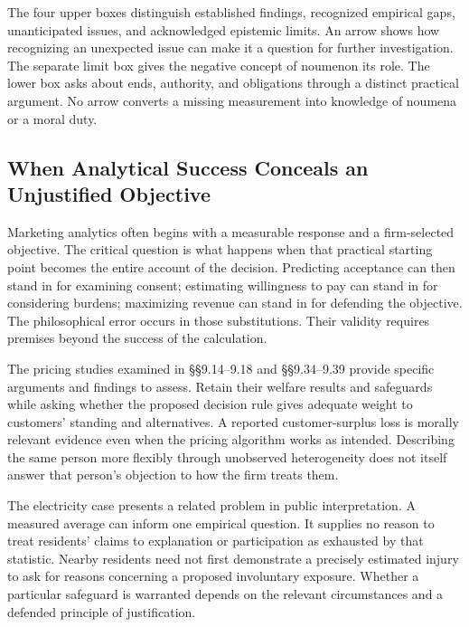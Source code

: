 The four upper boxes distinguish established findings, recognized
empirical gaps, unanticipated issues, and acknowledged epistemic limits.
An arrow shows how recognizing an unexpected issue can make it a
question for further investigation. The separate limit box gives the
negative concept of noumenon its role. The lower box asks about ends,
authority, and obligations through a distinct practical argument. No
arrow converts a missing measurement into knowledge of noumena or a
moral duty.

\hypertarget{M09-when-analytical-success-conceals-an-unjustified-objective}{%
\subsection{When Analytical Success Conceals an Unjustified
Objective}\label{M09-when-analytical-success-conceals-an-unjustified-objective}}

\noindent \noindent Marketing analytics often begins with a measurable response
and a firm-selected objective. The critical question is what happens
when that practical starting point becomes the entire account of the
decision. Predicting acceptance can then stand in for examining consent;
estimating willingness to pay can stand in for considering burdens;
maximizing revenue can stand in for defending the objective. The
philosophical error occurs in those substitutions. Their validity
requires premises beyond the success of the calculation.

The pricing studies examined in §§9.14--9.18 and §§9.34--9.39 provide
specific arguments and findings to assess. Retain their welfare results
and safeguards while asking whether the proposed decision rule gives
adequate weight to customers' standing and alternatives. A reported
customer-surplus loss is morally relevant evidence even when the pricing
algorithm works as intended. Describing the same person more flexibly
through unobserved heterogeneity does not itself answer that person's
objection to how the firm treats them.

The electricity case presents a related problem in public
interpretation. A measured average can inform one empirical question. It
supplies no reason to treat residents' claims to explanation or
participation as exhausted by that statistic. Nearby residents need not
first demonstrate a precisely estimated injury to ask for reasons
concerning a proposed involuntary exposure. Whether a particular
safeguard is warranted depends on the relevant circumstances and a
defended principle of justification.

